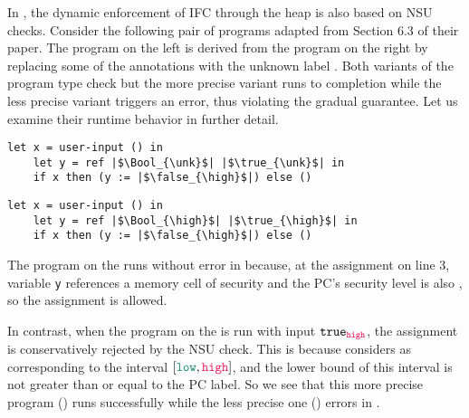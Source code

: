 In \GSLRef \parencite{Toro:2018aa}, the dynamic enforcement of IFC through the
heap is also based on NSU checks. Consider the following pair of programs
adapted from Section 6.3 of their paper. The program on the left is derived from
the program on the right by replacing some of the {\high} annotations with the
unknown label \unk. Both variants of the program type check but the more precise
variant runs to completion while the less precise variant triggers an error,
thus violating the gradual guarantee. Let us examine their runtime behavior in
further detail.

\begin{multicols}{2}
  \small
  \noindent
  \begin{lstlisting}[style=tt,basicstyle=\ttfamily\footnotesize]
    let x = user-input () in
    let y = ref |$\Bool_{\unk}$| |$\true_{\unk}$| in
    if x then (y := |$\false_{\high}$|) else ()
  \end{lstlisting}
  \columnbreak
  \begin{lstlisting}[style=tt,basicstyle=\ttfamily\footnotesize]
    let x = user-input () in
    let y = ref |$\Bool_{\high}$| |$\true_{\high}$| in
    if x then (y := |$\false_{\high}$|) else ()
  \end{lstlisting}
\end{multicols}

\noindent The program on the  runs without error in \GSLRef
because, at the assignment on line 3, variable \texttt{y} references a memory
cell of \high security and the PC's security level is also \high, so the
assignment is allowed.

In contrast, when the program on the  is run with input
$\true_{\high}$, the assignment is conservatively rejected by the NSU check.
This is because \GSLRef considers \unk as corresponding to the interval $[\low,
  \high]$, and the lower bound of this interval is not greater than or equal to
the \high PC label. So we see that this more precise program ()
runs successfully while the less precise one () errors in \GSLRef.

